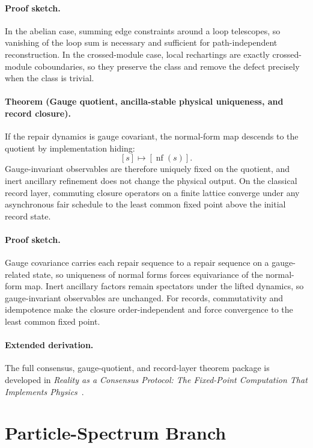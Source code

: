 \paragraph{Proof sketch.}
In the abelian case, summing edge constraints around a loop telescopes, so vanishing of the loop
sum is necessary and sufficient for path-independent reconstruction. In the crossed-module case,
local rechartings are exactly crossed-module coboundaries, so they preserve the class and remove
the defect precisely when the class is trivial.

\paragraph{Theorem (Gauge quotient, ancilla-stable physical uniqueness, and record closure).}
If the repair dynamics is gauge covariant, the normal-form map descends to the quotient by
implementation hiding:
\[
[s]\mapsto [\operatorname{nf}(s)].
\]
Gauge-invariant observables are therefore uniquely fixed on the quotient, and inert ancillary
refinement does not change the physical output. On the classical record layer, commuting closure
operators on a finite lattice converge under any asynchronous fair schedule to the least common
fixed point above the initial record state.

\paragraph{Proof sketch.}
Gauge covariance carries each repair sequence to a repair sequence on a gauge-related state, so
uniqueness of normal forms forces equivariance of the normal-form map. Inert ancillary factors
remain spectators under the lifted dynamics, so gauge-invariant observables are unchanged. For
records, commutativity and idempotence make the closure order-independent and force convergence to
the least common fixed point.

\paragraph{Extended derivation.}
The full consensus, gauge-quotient, and record-layer theorem package is developed in
\emph{Reality as a Consensus Protocol: The Fixed-Point Computation That Implements Physics}~\cite{ophconsensus}.

\section{Particle-Spectrum Branch}

